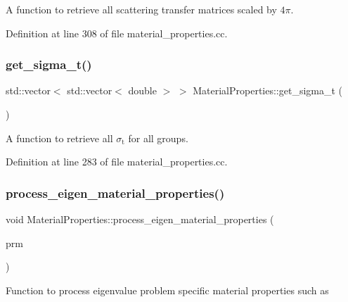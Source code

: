 A function to retrieve all scattering transfer matrices scaled by $4\pi$. 



Definition at line 308 of file material\+\_\+properties.\+cc.

\mbox{\label{class_material_properties_ada6ea8094dfc4b5c9610c6dc8d54a47a}} 
\subsubsection{\texorpdfstring{get\+\_\+sigma\+\_\+t()}{get\_sigma\_t()}}
{\footnotesize\ttfamily std\+::vector$<$ std\+::vector$<$ double $>$ $>$ Material\+Properties\+::get\+\_\+sigma\+\_\+t (\begin{DoxyParamCaption}{ }\end{DoxyParamCaption})}



A function to retrieve all $\sigma_\mathrm{t}$ for all groups. 



Definition at line 283 of file material\+\_\+properties.\+cc.

\mbox{\label{class_material_properties_a2a25d8392fb1002f27e048d40f37d627}} 
\subsubsection{\texorpdfstring{process\+\_\+eigen\+\_\+material\+\_\+properties()}{process\_eigen\_material\_properties()}}
{\footnotesize\ttfamily void Material\+Properties\+::process\+\_\+eigen\+\_\+material\+\_\+properties (\begin{DoxyParamCaption}\item[{Parameter\+Handler \&}]{prm }\end{DoxyParamCaption})\hspace{0.3cm}{\ttfamily [private]}}

Function to process eigenvalue problem specific material properties such as 

